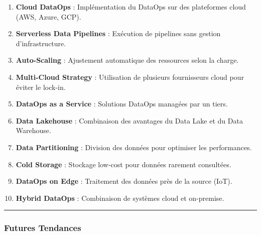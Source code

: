 \documentclass[
  letterpaper,
  DIV=11,
  numbers=noendperiod]{scrartcl}
\providecommand{\tightlist}{%
  \setlength{\itemsep}{0pt}\setlength{\parskip}{0pt}}\usepackage{longtable,booktabs,array}
\begin{document}
\begin{enumerate}
\def\labelenumi{\arabic{enumi}.}
\setcounter{enumi}{70}
\tightlist
\item
  \textbf{Cloud DataOps} : Implémentation du DataOps sur des plateformes
  cloud (AWS, Azure, GCP).\\
\item
  \textbf{Serverless Data Pipelines} : Exécution de pipelines sans
  gestion d'infrastructure.\\
\item
  \textbf{Auto-Scaling} : Ajustement automatique des ressources selon la
  charge.\\
\item
  \textbf{Multi-Cloud Strategy} : Utilisation de plusieurs fournisseurs
  cloud pour éviter le lock-in.\\
\item
  \textbf{DataOps as a Service} : Solutions DataOps managées par un
  tiers.\\
\item
  \textbf{Data Lakehouse} : Combinaison des avantages du Data Lake et du
  Data Warehouse.\\
\item
  \textbf{Data Partitioning} : Division des données pour optimiser les
  performances.\\
\item
  \textbf{Cold Storage} : Stockage low-cost pour données rarement
  consultées.\\
\item
  \textbf{DataOps on Edge} : Traitement des données près de la source
  (IoT).\\
\item
  \textbf{Hybrid DataOps} : Combinaison de systèmes cloud et on-premise.
\end{enumerate}

\begin{center}\rule{0.5\linewidth}{0.5pt}\end{center}

\subsubsection{\texorpdfstring{\textbf{Futures
Tendances}}{Futures Tendances}}\label{futures-tendances}
\end{document}
